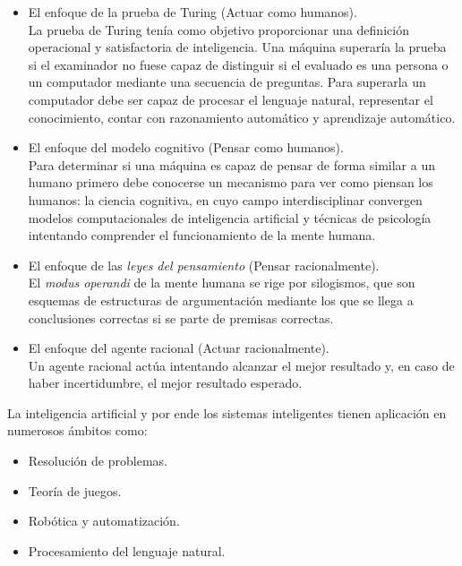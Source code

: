 \begin{itemize}
\item{El enfoque de la prueba de Turing (Actuar como humanos).}\\

  La prueba de Turing tenía como objetivo proporcionar una definición operacional y satisfactoria de inteligencia. Una máquina superaría la prueba si el examinador no fuese capaz de distinguir si el evaluado es una persona o un computador mediante una secuencia de preguntas. Para superarla un computador debe ser capaz de procesar el lenguaje natural, representar el conocimiento, contar con razonamiento automático y aprendizaje automático.
\item{El enfoque del modelo cognitivo (Pensar como humanos).}\\

Para determinar si una máquina es capaz de pensar de forma similar a un humano primero debe conocerse un mecanismo para ver como piensan los humanos: la ciencia cognitiva, en cuyo campo interdisciplinar convergen modelos computacionales de inteligencia artificial y técnicas de psicología intentando comprender el funcionamiento de la mente humana.
\item{El enfoque de las \textit{leyes del pensamiento} (Pensar racionalmente).}\\

  El \textit{modus operandi} de la mente humana se rige por silogismos, que son esquemas de estructuras de argumentación mediante los que se llega a conclusiones correctas si se parte de premisas correctas.
\item{El enfoque del agente racional (Actuar racionalmente).}\\

  Un agente racional actúa intentando alcanzar el mejor resultado y, en caso de haber incertidumbre, el mejor resultado esperado.
\end{itemize}
La inteligencia artificial y por ende los sistemas inteligentes tienen aplicación en numerosos ámbitos como:
\begin{itemize}
\item{Resolución de problemas.}
\item{Teoría de juegos.}
\item{Robótica y automatización.}
\item{Procesamiento del lenguaje natural.}
\end{itemize}

